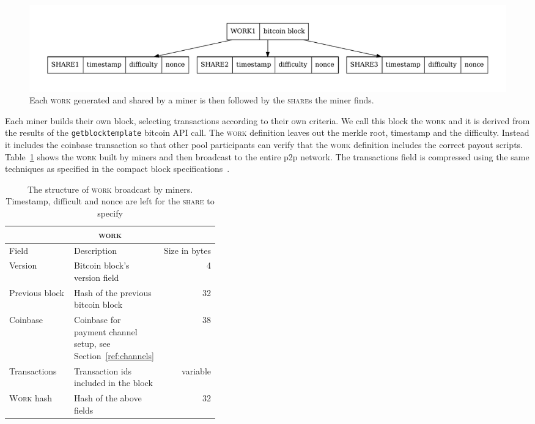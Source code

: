 \documentclass{article}
\begin{document}
\begin{figure}
  \begin{center}
    \includegraphics[width=1\textwidth]{work-share}
    \caption{Each \textsc{work} generated and shared by a miner is then
      followed by the \textsc{share}s the miner finds.}\label{fig:work-share}
    \end{center}
\end{figure}

Each miner builds their own block, selecting transactions according to
their own criteria. We call this block the \textsc{work} and it is
derived from the results of the \verb|getblocktemplate| bitcoin API
call. The \textsc{work} definition leaves out the merkle root,
timestamp and the difficulty. Instead it includes the coinbase
transaction so that other pool participants can verify that the
\textsc{work} definition includes the correct payout
scripts. Table~\ref{table:work} shows the \textsc{work} built by
miners and then broadcast to the entire p2p network. The transactions
field is compressed using the same techniques as specified in the
compact block specifications~\cite{compact-blocks}.

\begin{table}
  \centering
  \begin{tabular}{ |l|p{0.4\linewidth}|r| }
    \hline
    \multicolumn{3}{|c|}{\textsc{work}} \\
    \hline
    Field & Description & Size in bytes \\
    \hline
    Version & Bitcoin block's version field & 4\\
    \hline
    Previous block & Hash of the previous bitcoin block & 32 \\
    \hline
    Coinbase & Coinbase for payment channel setup, see Section~\ref{ref:channels} & 38 \\
    \hline
    Transactions & Transaction ids included in the block & variable \\
    \hline
    \textsc{Work} hash & Hash of the above fields & 32 \\
    \hline
  \end{tabular}
  \caption{The structure of \textsc{work} broadcast by
    miners. Timestamp, difficult and nonce are left for the
    \textsc{share} to specify }\label{table:work}
\end{table}
\end{document}
